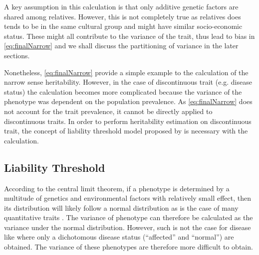 \documentclass[12pt]{scrbook}
\newcommand*{\glng}{\glsentrylong}
\begin{document}
	A key assumption in this calculation is that only additive genetic factors are shared among relatives.
	However, this is not completely true as relatives does tends to be in the same cultural group and might have similar socio-economic status.
	These might all contribute to the variance of the trait, thus lead to bias in \cref{eq:finalNarrow} and we shall discuss the partitioning of variance in the later sections.
	
	Nonetheless, \cref{eq:finalNarrow} provide a simple example to the calculation of the narrow sense heritability.
	However, in the case of discontinuous trait (e.g. disease status) the calculation becomes more complicated because the variance of the phenotype was dependent on the population prevalence.
	As \cref{eq:finalNarrow} does not account for the trait prevalence, it cannot be directly applied to discontinuous traits.
	In order to perform heritability estimation on discontinuous trait, the concept of liability threshold model proposed by \cite{Falconer1965} is necessary with the calculation.
	
	\subsection{Liability Threshold}
	\label{sec:liability}
	According to the central limit theorem, if a phenotype is determined by a multitude of genetics and environmental factors with relatively small effect, then its distribution will likely follow a normal distribution as is the case of many quantitative traits \citep{Visscher2008}. %
	The variance of phenotype can therefore be calculated as the variance under the normal distribution.
	However, such is not the case for disease like \glng{scz} where only a dichotomous disease status (``affected'' and ``normal'') are obtained.
	The variance of these phenotypes are therefore more difficult to obtain.
	
\end{document}
